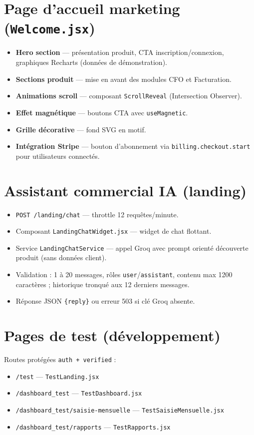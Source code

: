 \documentclass[11pt,a4paper]{report}
\newcommand{\route}[1]{\texttt{\small #1}}
\newcommand{\svc}[1]{\texttt{\small #1}}
\newcommand{\feat}[1]{\textbf{#1}}
\begin{document}
\section{Page d'accueil marketing (\texttt{Welcome.jsx})}

\begin{itemize}[leftmargin=*]
    \item \feat{Hero section} — présentation produit, CTA inscription/connexion, graphiques Recharts (données de démonstration).
    \item \feat{Sections produit} — mise en avant des modules CFO et Facturation.
    \item \feat{Animations scroll} — composant \texttt{ScrollReveal} (Intersection Observer).
    \item \feat{Effet magnétique} — boutons CTA avec \texttt{useMagnetic}.
    \item \feat{Grille décorative} — fond SVG en motif.
    \item \feat{Intégration Stripe} — bouton d'abonnement via \route{billing.checkout.start} pour utilisateurs connectés.
\end{itemize}

\section{Assistant commercial IA (landing)}

\begin{itemize}[leftmargin=*]
    \item \route{POST /landing/chat} — throttle 12 requêtes/minute.
    \item Composant \texttt{LandingChatWidget.jsx} — widget de chat flottant.
    \item Service \svc{LandingChatService} — appel Groq avec prompt orienté découverte produit (sans données client).
    \item Validation : 1 à 20 messages, rôles \texttt{user}/\texttt{assistant}, contenu max 1200 caractères ; historique tronqué aux 12 derniers messages.
    \item Réponse JSON \texttt{\{reply\}} ou erreur 503 si clé Groq absente.
\end{itemize}

\section{Pages de test (développement)}

Routes protégées \texttt{auth + verified} :
\begin{itemize}[leftmargin=*]
    \item \route{/test} — \texttt{TestLanding.jsx}
    \item \route{/dashboard\_test} — \texttt{TestDashboard.jsx}
    \item \route{/dashboard\_test/saisie-mensuelle} — \texttt{TestSaisieMensuelle.jsx}
    \item \route{/dashboard\_test/rapports} — \texttt{TestRapports.jsx}
\end{itemize}
\end{document}
